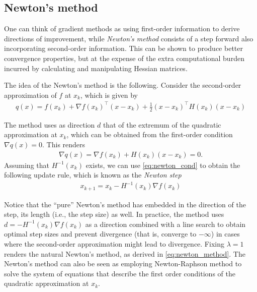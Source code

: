 \subsection{Newton's method}

One can think of gradient methods as using first-order information to derive directions of improvement, while \emph{Newton's method} consists of a step forward also incorporating second-order information. This can be shown to produce better convergence properties, but at the expense of the extra computational burden incurred by calculating and manipulating Hessian matrices.

The idea of the Newton's method is the following. Consider the second-order approximation of $f$ at $x_k$, which is given by
%
\begin{align*}
q(x) = f(x_k) + \nabla f(x_k)^\top (x - x_k) + \frac{1}{2}(x - x_k)^\top H(x_k)(x - x_k)
\end{align*}
%

The method uses as direction $d$ that of the extremum of the quadratic approximation at $x_k$, which can be obtained from the first-order condition $\nabla q(x) = 0$. This renders
%
\begin{align}
\nabla q(x) = \nabla f(x_k) + H(x_k)(x - x_k) = 0. \label{eq:newton_cond}
\end{align}
%
Assuming that $H^{-1}(x_k)$ exists, we can use \eqref{eq:newton_cond} to obtain the following update rule, which is known as the \emph{Newton step}
%
\begin{align}
x_{k+1} = x_k - H^{-1}(x_k)\nabla f(x_k)	 \label{eq:newton_method}
\end{align}
%

Notice that the ``pure'' Newton's method has embedded in the direction of the step, its length (i.e., the step size) as well. In practice, the method uses $d = - H^{-1}(x_k)\nabla f(x_k)$ as a direction combined with a line search to obtain optimal step sizes and prevent divergence (that is, converge to $-\infty$) in cases where the second-order approximation might lead to divergence. Fixing $\lambda = 1$ renders the natural Newton's method, as derived in \eqref{eq:newton_method}. The Newton's method can also be seen as employing Newton-Raphson method to solve the system of equations that describe the first order conditions of the quadratic approximation at $x_k$. 

